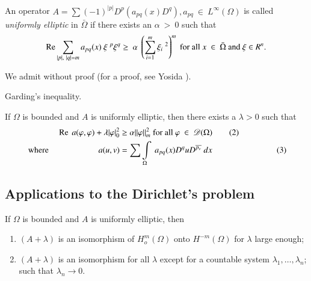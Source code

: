 \subsection{}\label{lec12:sec7:subsec1} %

\begin{definition}\label{lec12:sec7:subsec1:def7.1} %
  An operator $A = \sum (-1)^{|p|}D^p (a_{pq}{(x)D^q}),a_{pq} ~
  \in ~ L^\infty (\Omega)$ is called {\em{uniformly elliptic}}
  in $\bar{\Omega}$ if there exists an $\alpha ~ > ~ 0$ such that  
  $$
  \operatorname{Re}  \sum_{|p|, ~ |q| = m} a_{pq}(x) ~ \xi~ ^{p}\xi^{q} \ge ~ \alpha
  ~\left(\sum_{i=1}^{m} \xi_i~^2\right)^m \text{ for all } x ~ \in ~
  \bar{\Omega} ~\text{and}~ \xi \in R^n. 
  $$
\end{definition}

We admit without proof (for a proof, see Yosida \cite{k21}).

\begin{theorem}\label{lec12:sec7:subsec1:thm7.1}%
  Garding's inequality.\pageoriginale
\end{theorem}

 If $\Omega$ is bounded and $A$ is uniformly elliptic, then there
 exists a $\lambda > 0$ such that  
 \begin{align*}
   \operatorname{Re}  ~ a(\varphi,\varphi) + \lambda | \varphi |^2_0  & \ge \alpha ||
   \varphi ||^2_m \text{ for all } \varphi ~ \in ~ \mathscr{D}
   (\Omega)\tag{2}\label{lec12:sec7:subsec1:eq2} \\
   \text{ where } \hspace{2cm} 
   a(u,v)   &= \sum \int\limits_{\Omega} ~ a_{pq}(x) D^q u D^{\overline{p_v}}
   ~ dx \hspace{2cm} \tag{3}\label{lec12:sec7:subsec1:eq3} 
 \end{align*} 

\subsection{Applications to the Dirichlet's problem}\label{lec12:sec7:subsec2}

\begin{theorem}\label{lec12:sec7:subsec2:thm7.2}%
  If $\Omega$ is bounded and $A$ is uniformly elliptic, then 
  \begin{enumerate}[\rm a)]
  \item $(A + \lambda)$ is an isomorphism of $H^m_o(\Omega)$ onto
    $H^{-m}(\Omega)$ for $\lambda$ large enough; 
  \item $(A + \lambda)$ is an isomorphism for all $\lambda$ except for a
    countable system $\lambda_1, \ldots, \lambda_n$; such that
    $\lambda_n \rightarrow 0$. 
  \end{enumerate} 
\end{theorem} 

